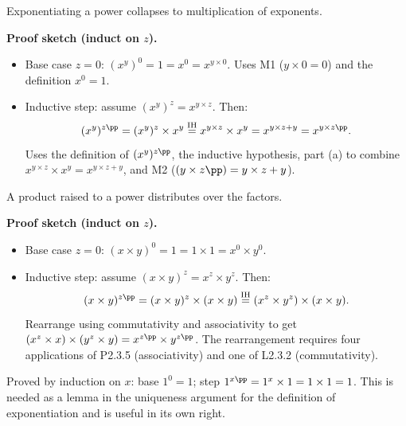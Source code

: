 \begin{remark}[Part (b): $(x^y)^z = x^{y \times z}$ — the power of a power law]
Exponentiating a power collapses to multiplication of exponents.

\medskip
\textbf{Proof sketch (induct on $z$).}
\begin{itemize}
  \item Base case $z = 0$: $(x^y)^0 = 1 = x^0 = x^{y \times 0}$.
    Uses M1 ($y \times 0 = 0$) and the definition $x^0 = 1$.
  \item Inductive step: assume $(x^y)^z = x^{y \times z}$. Then:
    \[
    (x^y)^{z\pp} = (x^y)^z \times x^y
    \stackrel{\text{IH}}{=} x^{y \times z} \times x^y = x^{y \times z + y}
    = x^{y \times z\pp}.
    \]
    Uses the definition of $(x^y)^{z\pp}$, the inductive hypothesis,
    part (a) to combine $x^{y \times z} \times x^y = x^{y \times z + y}$,
    and M2 ($(y \times z\pp) = y \times z + y$).
\end{itemize}
\end{remark}

\begin{remark}[Part (c): $(x \times y)^z = x^z \times y^z$ — the product power law]
A product raised to a power distributes over the factors.

\medskip
\textbf{Proof sketch (induct on $z$).}
\begin{itemize}
  \item Base case $z = 0$: $(x \times y)^0 = 1 = 1 \times 1 = x^0 \times y^0$.
  \item Inductive step: assume $(x \times y)^z = x^z \times y^z$. Then:
    \[
    (x \times y)^{z\pp} = (x \times y)^z \times (x \times y)
    \stackrel{\text{IH}}{=} (x^z \times y^z) \times (x \times y).
    \]
    Rearrange using commutativity and associativity to get
    $(x^z \times x) \times (y^z \times y) = x^{z\pp} \times y^{z\pp}$.
    The rearrangement requires four applications of P2.3.5 (associativity)
    and one of L2.3.2 (commutativity).
\end{itemize}
\end{remark}

\begin{remark}[Also useful: Mendelson Lemma 6.2 ($1^x = 1$)]
Proved by induction on $x$:
base $1^0 = 1$;
step $1^{x\pp} = 1^x \times 1 = 1 \times 1 = 1$.
This is needed as a lemma in the uniqueness argument for the
definition of exponentiation and is useful in its own right.
\end{remark}
